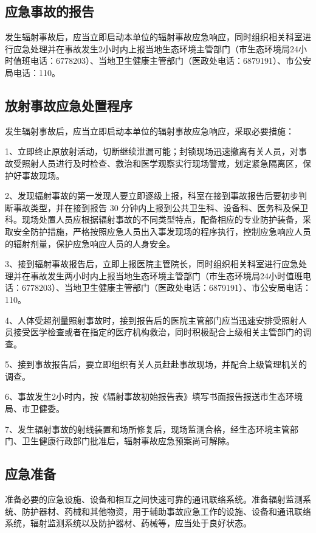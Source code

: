 \subsection{应急事故的报告}

发生辐射事故后，应当立即启动本单位的辐射事故应急响应，同时组织相关科室进行应急处理并在事故发生2小时内上报当地生态环境主管部门（市生态环境局24小时值班电话：6778203）、当地卫生健康主管部门（医政处电话：6879191）、市公安局电话：110。

\subsection{放射事故应急处置程序}

发生辐射事故后，应当立即启动本单位的辐射事故应急响应，采取必要措施：

1、立即终止原放射活动，切断继续泄漏可能；封锁现场迅速撤离有关人员，对事故受照射人员进行及时检查、救治和医学观察实行现场警戒，划定紧急隔离区，保护好事故现场。

2、发现辐射事故的第一发现人要立即逐级上报，科室在接到事故报告后要初步判断事故类型，并在接到报告 30 分钟内上报到公共卫生科、设备科、医务科及保卫科。现场处置人员应根据辐射事故的不同类型特点，配备相应的专业防护装备，采取安全防护措施，严格按照应急人员出入事发现场的程序执行，控制应急响应人员的辐射剂量，保护应急响应人员的人身安全。

3、接到辐射事故报告后，立即上报医院主管院长，同时组织相关科室进行应急处理并在事故发生两小时内上报当地生态环境主管部门（市生态环境局24小时值班电话：6778203）、当地卫生健康主管部门（医政处电话：6879191）、市公安局电话：110。

4、人体受超剂量照射事故时，接到报告后的医院主管部门应当迅速安排受照射人员接受医学检查或者在指定的医疗机构救治，同时积极配合上级相关主管部门的调查。

5、接到事故报告后，要立即组织有关人员赶赴事故现场，并配合上级管理机关的调查。

6、事故发生2小时内，按《辐射事故初始报告表》填写书面报告报送市生态环境局、市卫健委。

7、发生辐射事故的射线装置和场所修复后，现场监测合格，经生态环境主管部门、卫生健康行政部门批准后，辐射事故应急预案尚可解除。

\subsection{应急准备}

准备必要的应急设施、设备和相互之间快速可靠的通讯联络系统。准备辐射监测系统、防护器材、药械和其他物资，用于辅助事故应急工作的设施、设备和通讯联络系统，辐射监测系统以及防护器材、药械等，应当处于良好状态。


